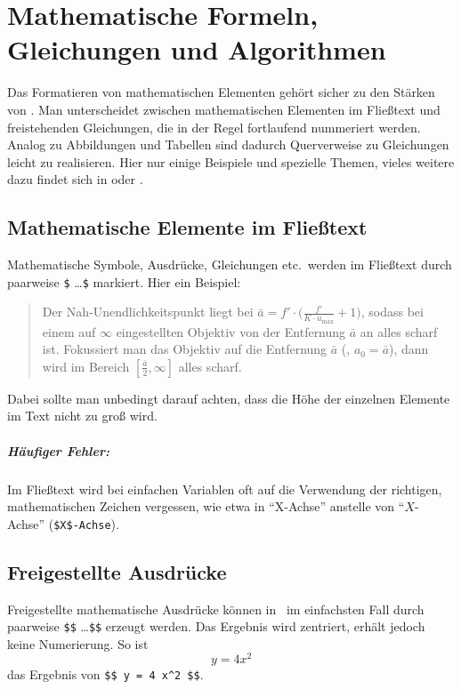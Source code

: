 \chapter[Mathem.\ Formeln etc.]{Mathematische Formeln, Gleichungen und Algorithmen}
\label{chap:Mathematik}



Das Formatieren von mathematischen Elementen gehört sicher zu den
Stär\-ken von \latex. Man unterscheidet zwischen mathematischen Elementen
im Fließtext und freistehenden Gleichungen, die in der Regel
fortlaufend nummeriert werden. Analog zu Abbildungen und Tabellen sind dadurch
Querverweise zu Gleichungen leicht zu realisieren.
Hier nur einige Beispiele und spezielle Themen, vieles weitere dazu findet sich \zB in
\cite[Kap.\ 5]{Kopka98} oder \cite{mathmode09}.


\section{Mathematische Elemente im Fließtext}

Mathematische Symbole, Ausdrücke, Gleichungen etc.\ werden im Fließtext durch paarweise \verb!$! \ldots \verb!$! markiert. Hier ein Beispiel:
%
\begin{quote}
Der Nah-Unendlichkeitspunkt liegt bei
$\bar{a} = f' \cdot \bigl( \frac{f'}{K \cdot u_{\max}} + 1 \bigr)$,
sodass bei einem auf $\infty$ eingestellten Objektiv von der Entfernung
$\bar{a}$ an alles scharf ist. Fokussiert man das
Objektiv auf die Entfernung $\bar{a}$ (\dah, $a_0 = \bar{a}$), dann wird
im Bereich $[\frac{\bar{a}}{2}, \infty]$ alles scharf.
\end{quote}
%
Dabei sollte man unbedingt darauf achten, dass die Höhe der einzelnen Elemente im Text nicht zu groß wird. 

\paragraph{Häufiger Fehler:} 
Im Fließtext wird bei einfachen Variablen oft auf die Verwendung der richtigen, mathematischen Zeichen vergessen, wie etwa in 
"`X-Achse"' anstelle von "`$X$-Achse"' (\verb!$X$-Achse!).



\section{Freigestellte Ausdrücke}

Freigestellte mathematische Ausdrücke können in \latex\ im einfachsten Fall durch paarweise \verb!$$! \ldots \verb!$$! erzeugt werden. Das Ergebnis wird zentriert, erhält jedoch keine Numerierung. So ist \zB\ $$ y = 4 x^2 $$ das Ergebnis von \verb!$$ y = 4 x^2 $$!.

